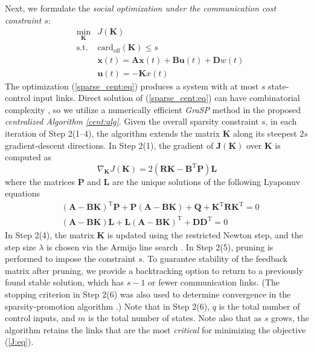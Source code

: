 \documentclass[12pt, draftclsnofoot,onecolumn]{IEEEtran}
\begin{document}
Next, we formulate the {\it social optimization under the communication cost constraint $s$}: 
\begin{eqnarray}
&\underset{\boldsymbol K}{\mathrm{min}}& J(\boldsymbol{K})\nonumber\\
&\mbox{s.t.}&  \mathrm{card}_{\mathrm{off}}({\boldsymbol K}) \leq s \nonumber\\
&&\dot{\boldsymbol x}(t)={\boldsymbol A}{\boldsymbol x}(t)+{\boldsymbol B}{\boldsymbol u}(t) + {\boldsymbol D}{w}(t)\nonumber\\
& & {\boldsymbol u}(t) = -{\boldsymbol Kx}(t)
\label{sparse_cent:eq}
\end{eqnarray}
\noindent
The optimization (\ref{sparse_cent:eq}) produces a system with at most $s$ state-control input links. Direct solution of (\ref{sparse_cent:eq}) can have combinatorial complexity \cite{bahmani2013greedy}, so we utilize a numerically efficient {\it GraSP} method \cite{bahmani2013greedy} in the proposed {\it centralized Algorithm \ref{cent:alg}}. Given the overall sparsity constraint $s$, in each iteration of Step 2(1--4), the algorithm extends the matrix ${\boldsymbol K}$ along its steepest $2s$ gradient-descent directions. In Step 2(1), the gradient of $\boldsymbol J(\boldsymbol K)$ over $\boldsymbol K$ is computed as \cite{fardad2009optimal} 
\begin{equation}
\nabla_{{\boldsymbol K}}J({\boldsymbol K}) = 2(\boldsymbol R \boldsymbol K - \boldsymbol B^{\mathrm{T}}\boldsymbol P)\boldsymbol L
\label{gradJ:eq}
\end{equation}
\noindent where the matrices $\boldsymbol P$ and $\boldsymbol L$ are the unique solutions of the following Lyaponuv equations
\begin{align}
\label{lyapJ:eq}
&(\boldsymbol A - \boldsymbol B\boldsymbol K)^{\mathrm{T}}\boldsymbol P + \boldsymbol P(\boldsymbol A - \boldsymbol B\boldsymbol K) + \boldsymbol Q + \boldsymbol K^{\mathrm{T}}\boldsymbol R \boldsymbol K^{\mathrm{T}}=0\nonumber\\
& (\boldsymbol A - \boldsymbol B\boldsymbol K)\boldsymbol L + \boldsymbol L(\boldsymbol A - \boldsymbol B\boldsymbol K)^{\mathrm{T}} + \boldsymbol D \boldsymbol D^{\mathrm{T}} = 0
\end{align}
\noindent In Step 2(4), the matrix $\boldsymbol K$ is updated using the restricted Newton step, and the step size $\lambda$ is chosen via the Armijo line search \cite{Boyd:2004aa}. In Step 2(5), pruning is performed to impose the constraint $s$. To guarantee stability of the feedback matrix after pruning, we provide a backtracking option to return to a previously found stable solution, which has $s-1$ or fewer communication links. (The stopping criterion in Step 2(6) was also used to determine convergence in the sparsity-promotion algorithm \cite{dorjovchebulTPS14}.) Note that in Step 2(6), $q$ is the total number of control inputs, and $m$ is the total number of states. Note also that as $s$ grows, the algorithm retains the links that are the most {\it critical} for minimizing the objective (\ref{J:eq}).
\end{document}
